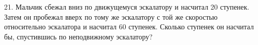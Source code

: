 21. Мальчик сбежал вниз по движущемуся эскалатору и насчитал 20 ступенек. Затем он пробежал вверх по тому же эскалатору с той же скоростью относительно эскалатора и насчитал 60 ступенек. Сколько ступенек он насчитал бы, спустившись по неподвижному эскалатору?\\
